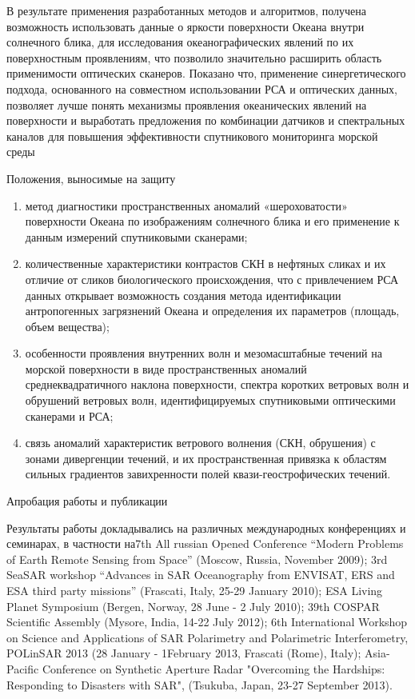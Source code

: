 В результате применения разработанных методов и алгоритмов, получена возможность использовать данные о яркости поверхности Океана внутри солнечного блика, для исследования океанографических явлений по их поверхностным проявлениям, что позволило значительно расширить область применимости оптических сканеров. Показано что, применение синергетического подхода, основанного на совместном использовании РСА и оптических данных, позволяет лучше понять механизмы проявления океанических явлений на поверхности и выработать предложения по комбинации датчиков и спектральных каналов для повышения эффективности спутникового мониторинга морской среды 

 Положения, выносимые на защиту

\begin{enumerate}
\item  метод диагностики пространственных аномалий «шероховатости» поверхности Океана по изображениям солнечного блика и его применение к данным измерений спутниковыми сканерами;

\item  количественные характеристики контрастов СКН в нефтяных сликах и их отличие от сликов биологического происхождения, что с привлечением РСА данных открывает возможность создания метода идентификации антропогенных загрязнений Океана и определения их параметров (площадь, объем вещества);

\item  особенности проявления внутренних волн и мезомасштабные течений на морской поверхности в виде пространственных аномалий среднеквадратичного наклона поверхности, спектра коротких ветровых волн и обрушений ветровых волн, идентифицируемых спутниковыми оптическими сканерами и РСА; 

\item  связь аномалий характеристик ветрового волнения (СКН, обрушения) с зонами дивергенции течений, и их пространственная привязка к областям сильных градиентов завихренности полей квази-геострофических течений.
\end{enumerate}

 Апробация работы и публикации



Результаты работы докладывались на различных международных конференциях и семинарах, в частности на7th All russian Opened Conference ``Modern Problems of Earth Remote Sensing from Space'' (Moscow, Russia, November 2009); 3rd SeaSAR workshop ``Advances in SAR Oceanography from ENVISAT, ERS and ESA third party missions'' (Frascati, Italy, 25-29 January 2010); ESA Living Planet Symposium (Bergen, Norway, 28 June - 2 July 2010); 39th COSPAR Scientific Assembly (Mysore, India, 14-22 July 2012); 6th International Workshop on Science and Applications of SAR Polarimetry and Polarimetric Interferometry, POLinSAR 2013 (28 January - 1February 2013, Frascati (Rome), Italy); Asia-Pacific Conference on Synthetic Aperture Radar "Overcoming the Hardships: Responding to Disasters with SAR", (Tsukuba, Japan, 23-27 September 2013).

